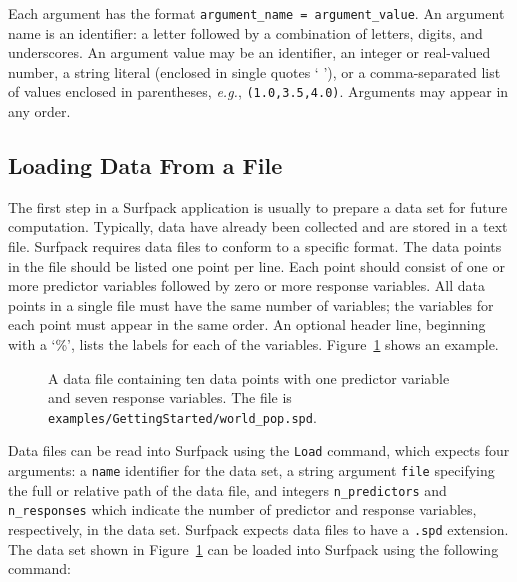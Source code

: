 \documentclass{article}
\begin{document}
Each argument has the format \texttt{argument\_name =
argument\_value}.  An argument name is an identifier:  a letter followed by a
combination of letters, digits, and underscores.  An
argument value may be an identifier, an integer or
real-valued number, a string literal (enclosed in single quotes ` '), or a comma-separated list of values enclosed in parentheses,
{\em e.g.}, \texttt{(1.0,3.5,4.0)}.  Arguments may appear in any order.

\subsection{Loading Data From a File}\label{sec:loaddata}
The first step in a Surfpack application is usually to prepare a data set for
future computation.  Typically, data have already been collected and are stored in a text file.  Surfpack requires data files to conform to a specific format.  The data points in the file should be listed one point per line.  Each point should consist of one or more predictor variables followed by zero or more response variables.  All data points in a single file must have the same number of variables; the variables for each point must appear in the same order.  An optional header line, beginning with a `\%', lists the labels for each of the variables.  Figure~\ref{fig:world_population} shows an example.
\begin{figure}[htbp]
  \centering
  \begin{bigbox}
	\begin{small}
 	\end{small}
  \end{bigbox}
  \caption{A data file containing ten data points with one predictor variable and seven response variables.  The file is \texttt{examples/GettingStarted/world\_pop.spd}.}
   \label{fig:world_population}
\end{figure}

Data files can be read into Surfpack using the \texttt{Load} command, which expects four arguments: a \texttt{name} identifier for the data set, a string argument \texttt{file} specifying the full or relative path of the data file, and integers \texttt{n\_predictors} and \texttt{n\_responses} which indicate the number of predictor and response variables, respectively, in the data set.  Surfpack expects data files to have a \texttt{.spd} extension.  The data set shown in Figure~\ref{fig:world_population} can be loaded into Surfpack using the following command:
\end{document}
